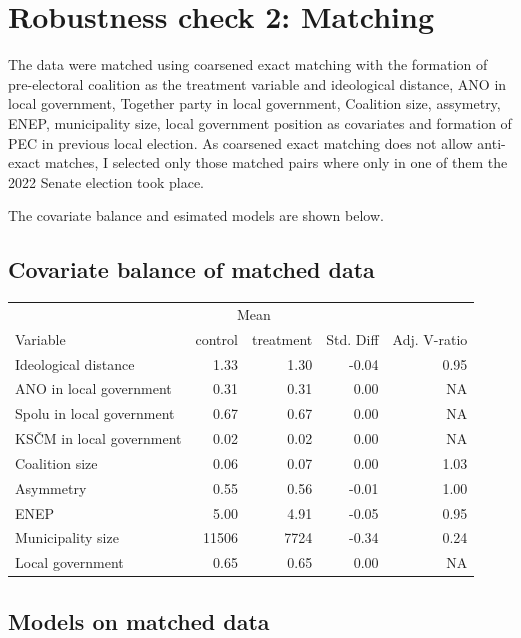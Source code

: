 \documentclass[fignum,12pt,titlepage]{article}
\begin{document}
{}

\newpage
\section{Robustness check 2: Matching}
\label{app:2}

The data were matched using coarsened exact matching with the formation of pre-electoral coalition as the treatment variable and ideological distance, ANO in local government, Together party in local government, Coalition size, assymetry, ENEP, municipality size, local government position as covariates and formation of PEC in previous local election. 
As coarsened exact matching does not allow anti-exact matches, I selected only those matched pairs where only in one of them the 2022 Senate election took place.

The covariate balance and esimated models are shown below.

\subsection{Covariate balance of matched data \label{tab:4}}

\begin{tabular}{|l|rr|r|r|}
\hline
  & \multicolumn{2}{c|}{Mean} &  &  \\
Variable  & control & treatment & Std. Diff &	Adj. V-ratio\\
\hline
Ideological distance & 1.33 & 1.30 & -0.04 & 0.95 \\
\hline
ANO in local government & 0.31 & 0.31 & 0.00 & NA\\
\hline
Spolu in local government & 0.67 & 0.67 & 0.00 & NA\\
\hline
KSČM in local government & 0.02 & 0.02 & 0.00 & NA\\
\hline
Coalition size & 0.06 & 0.07 & 0.00 & 1.03 \\
\hline
Asymmetry & 0.55 & 0.56 & -0.01 & 1.00 \\
\hline
ENEP & 5.00 & 4.91 & -0.05 & 0.95 \\
\hline
Municipality size & 11506 & 7724 & -0.34 & 0.24 \\
\hline
Local government & 0.65 & 0.65 & 0.00 & NA\\
\hline
\end{tabular}


\subsection{Models on matched data \label{tab:5}}

\end{document}
